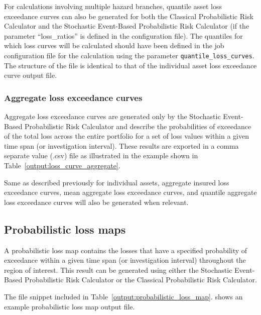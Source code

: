 For calculations involving multiple hazard branches, quantile asset loss
exceedance curves can also be generated for both the Classical Probabilistic
Risk Calculator and the Stochastic Event-Based Probabilistic Risk Calculator
(if the parameter ``loss\_ratios'' is defined in the configuration file). The
quantiles for which loss curves will be calculated should have been defined in
the job configuration file for the calculation using the parameter
\Verb+quantile_loss_curves+. The structure of the file is identical to that of
the individual asset loss exceedance curve output file.

\subsubsection{Aggregate loss exceedance curves}
\label{subsubsec:aggregate_loss_curves}

Aggregate loss exceedance curves are generated only by the Stochastic Event-
Based Probabilistic Risk Calculator and describe the probabilities of
exceedance of the total loss across the entire portfolio for a set of loss
values within a given time span (or investigation interval). These results are
exported in a comma separate value (.csv) file as illustrated in the example
shown in Table~\ref{output:loss_curve_aggregate}.



Same as described previously for individual assets, aggregate insured loss
exceedance curves, mean aggregate loss exceedance curves, and quantile
aggregate loss exceedance curves will also be generated when relevant.


\subsection{Probabilistic loss maps}
\label{subsec:probabilistic_loss_map}

A probabilistic loss map contains the losses that have a specified probability
of exceedance within a given time span (or investigation interval) throughout
the region of interest. This result can be generated using either the
Stochastic Event-Based Probabilistic Risk Calculator or the Classical
Probabilistic Risk Calculator.

The file snippet included in Table~\ref{output:probabilistic_loss_map}.
shows an example probabilistic loss map output file.




